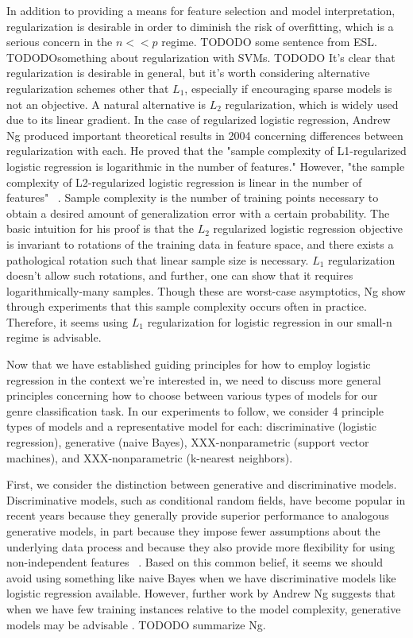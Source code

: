 \documentclass[]{article}
\begin{document}
	In addition to providing a means for feature selection and model interpretation, regularization is desirable in order to diminish the risk of overfitting, which is a serious concern in the $n << p$ regime. TODODO some sentence from ESL. TODODOsomething about regularization with SVMs. TODODO
	It's clear that regularization is desirable in general, but it's worth considering alternative regularization schemes other that $L_1$, especially if encouraging sparse models is not an objective. A natural alternative is $L_2$ regularization, which is widely used due to its linear gradient. In the case of regularized logistic regression, Andrew Ng produced important theoretical results in 2004 concerning differences between regularization with each. He proved that the "sample complexity of L1-regularized logistic regression is logarithmic in the number of features." However,  "the sample complexity of L2-regularized logistic regression is linear in the number of features"  ~\cite{ng2004feature}. Sample complexity is the number of training points necessary to obtain a desired amount of generalization error with a certain probability. The basic intuition for his proof is that the $L_2$ regularized logistic regression objective is invariant to rotations of the training data in feature space, and there exists a pathological rotation such that linear sample size is necessary. $L_1$ regularization doesn't allow such rotations, and further, one can show that it requires logarithmically-many samples. Though these are worst-case asymptotics, Ng show through experiments that  this sample complexity occurs often in practice. Therefore, it seems using $L_1$ regularization for logistic regression in our small-n regime is advisable. 

	Now that we have established guiding principles for how to employ logistic regression in the context we're interested in, we need to discuss more general principles concerning how to choose between various types of models for our genre classification task. In our experiments to follow, we consider 4 principle types of models and a representative model for each: discriminative (logistic regression), generative (naive Bayes), XXX-nonparametric (support vector machines), and XXX-nonparametric (k-nearest neighbors). 

	First, we consider the distinction between generative and discriminative models. Discriminative models, such as conditional random fields, have become popular in recent years because they generally provide superior performance to analogous generative models, in part because they impose fewer assumptions about the underlying data process and because they also provide more flexibility for using non-independent features ~\cite{lafferty2001conditional}. Based on this common belief, it seems we should avoid using something like naive Bayes when we have discriminative models like logistic regression available. However, further work by Andrew Ng suggests that when we have few training instances relative to the model complexity, generative models may be advisable \cite{jordan2002discriminative}. TODODO summarize Ng.
	
\end{document}
